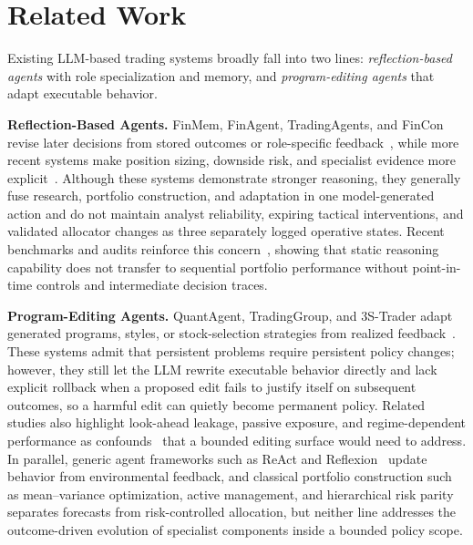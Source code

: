 \documentclass[letterpaper]{article}
\begin{document}
\section{Related Work}

Existing LLM-based trading systems broadly fall into two lines:
\emph{reflection-based agents} with role specialization and memory, and
\emph{program-editing agents} that adapt executable behavior.

\textbf{Reflection-Based Agents.}\quad
FinMem, FinAgent, TradingAgents, and FinCon revise later decisions from stored
outcomes or role-specific
feedback~\citep{yu2023finmem,zhang2024finagent,xiao2024tradingagents,yu2024fincon},
while more recent systems make position sizing, downside risk, and specialist
evidence more explicit~\citep{liu2025finpos,liu2025finrs,rashid2026finanalyst}.
Although these systems demonstrate stronger reasoning, they generally fuse
research, portfolio construction, and adaptation in one model-generated action
and do not maintain analyst reliability, expiring tactical interventions, and
validated allocator changes as three separately logged operative states.
Recent benchmarks and audits reinforce this
concern~\citep{chen2025stockbench,yu2025livetradebench,fan2025aitrader,yao2026execution,qu2026clqt,li2026nextfund,duan2026tradelens},
showing that static reasoning capability does not transfer to sequential
portfolio performance without point-in-time controls and intermediate
decision traces.

\textbf{Program-Editing Agents.}\quad
QuantAgent, TradingGroup, and 3S-Trader adapt generated programs, styles, or
stock-selection strategies from realized
feedback~\citep{wang2024quantagent,tian2025tradinggroup,chen2025threestrader}.
These systems admit that persistent problems require persistent policy changes;
however, they still let the LLM rewrite executable behavior directly and lack
explicit rollback when a proposed edit fails to justify itself on subsequent
outcomes, so a harmful edit can quietly become permanent policy. Related
studies also highlight look-ahead leakage, passive exposure, and
regime-dependent performance as
confounds~\citep{glasserman2024lookahead,fu2025newquant,zhu2026ktdfin,jeon2026blindtrade}
that a bounded editing surface would need to address. In parallel, generic
agent frameworks such as ReAct and
Reflexion~\citep{yao2022react,shinn2023reflexion} update behavior from
environmental feedback, and classical portfolio construction such as
mean--variance optimization, active management, and hierarchical risk
parity~\citep{markowitz1952portfolio,grinold2000active,lopezdeprado2016hrp}
separates forecasts from risk-controlled allocation, but neither line
addresses the outcome-driven evolution of specialist components inside a
bounded policy scope.
\end{document}
